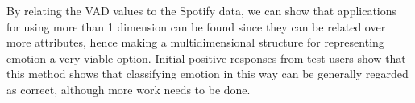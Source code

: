 By relating the VAD values to the Spotify data, we can show that applications for using more than 1 dimension can be found since they can be related over more attributes, hence making a multidimensional structure for representing emotion a very viable option. Initial positive responses from test users show that this method shows that classifying emotion in this way can be generally regarded as correct, although more work needs to be done.

